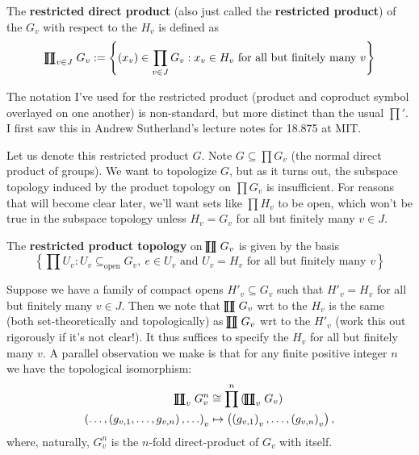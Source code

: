 \documentclass[11pt, x11names, openany]{book}
\newcommand{\set}[1]{\left\{ #1 \right\}}
\renewcommand{\brack}[1]{\left(   #1 \right)}
\newcommand{\rprod}{
    \mathrel{\ooalign{\hidewidth $\prod$ \hidewidth \cr $\coprod$}}
}
\begin{document}
\begin{defn}
\label{def: resprod}
The \textbf{restricted direct product} (also just called the \textbf{restricted product}) of the $G_v$ with respect to the $H_v$ is defined as 
\begin{equation*}
    \rprod_{v \in J} G_v := \set{(x_v) \in \prod_{v \in J} G_v : x_v \in H_v \text{ for all but finitely many } v}
\end{equation*}
\end{defn}

\begin{remark}[Notation]
The notation I've used for the restricted product (product and coproduct symbol overlayed on one another) is non-standard, but more distinct than the usual $\prod'$. I first saw this in Andrew Sutherland's lecture notes for 18.875 at MIT.
\end{remark}

Let us denote this restricted product $G$. Note $G \subseteq \prod G_v$ (the normal
direct product of groups). We want to topologize $G$, but as it turns out, the subspace topology induced by the product topology on $\prod G_v$ is insufficient. For reasons that will become clear later, we'll want sets like $\prod H_v$ to be open, which won't be true in the subspace topology unless $H_v = G_v$ for all but finitely many $v \in J$.

\begin{defn}
\label{def: resprod topology}
    The \textbf{restricted product topology} on $\rprod G_v$ is given by the basis
    \begin{equation*}
        \set{\prod U_v : U_v \subseteq_{\text{open}} G_v, \ e \in U_v \text{ and } U_v = H_v \text{ for all but finitely many } v}
    \end{equation*}
\end{defn}

\begin{observation}
Suppose we have a family of compact opens $H'_v \subseteq G_v$ such that $H'_v = H_v$ for all but finitely many $v \in J$. Then we note that $\rprod G_v$ wrt to the $H_v$ is the same (both set-theoretically and topologically) as $\rprod G_v$ wrt to the $H'_v$ (work this out rigorously if it's not clear!). It thus suffices to specify the $H_v$ for all but finitely many $v$. A parallel observation we make is that for any finite positive integer $n$ we have the topological isomorphism:
\begin{align}
\label{eqn: resprod dir-prod isomorphism}
    \rprod_v G_v^n  &\cong \prod^n \brack{ \rprod_v G_v} \nonumber \\
    \brack{ \ldots, \brack{g_{v, 1}, \ldots, g_{v, n}}, \ldots}_v &\mapsto \brack{\brack{g_{v, 1}}_v, \ldots, \brack{g_{v, n}}_v},
\end{align}
where, naturally, $G^n_v$ is the $n$-fold direct-product of $G_v$ with itself. 
\end{observation}
\end{document}
